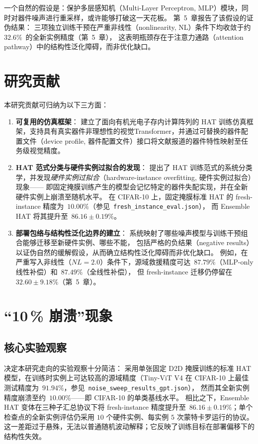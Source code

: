 一个自然的假设是：保护多层感知机（Multi-Layer Perceptron, MLP）模块，同时对器件噪声进行重采样，或许能够打破这一天花板。
第~5~章报告了该假设的证伪结果：
三项独立训练干预在严重非线性（nonlinearity, NL）条件下均收敛于约~$32.6\%$~的全新实例精度（第~5~章），
这表明瓶颈存在于注意力通路（attention pathway）中的结构性泛化障碍，而非优化缺口。

\section{研究贡献}

本研究贡献可归纳为以下三方面：

\begin{enumerate}
    \item \textbf{可复用的仿真框架}：
    建立了面向有机光电子存内计算阵列的 HAT 训练仿真框架，支持具有真实器件非理想性的视觉Transformer，并通过可替换的器件配置文件（device profile, 器件配置文件）接口将文献报道的器件特性映射至任务级视觉精度。

    \item \textbf{HAT 范式分类与硬件实例过拟合的发现}：
    提出了 HAT 训练范式的系统分类学，并发现\emph{硬件实例过拟合}（hardware-instance overfitting, 硬件实例过拟合）现象——
    即固定掩膜训练产生的模型会记忆特定的器件失配实现，并在全新硬件实例上崩溃至随机水平。
    在 CIFAR-10 上，固定掩膜标准 HAT 的 fresh-instance 精度为~$10.00\%$（参见~\texttt{fresh\_instance\_eval.json}），
    而 Ensemble HAT 将其提升至~$86.16\pm0.19\%$。

    \item \textbf{部署包络与结构性泛化边界的建立}：
    系统映射了哪些噪声模型与训练干预组合能够迁移至新硬件实例、哪些不能，
    包括严格的负结果（negative results）以证伪自然的缓解假设，从而确立结构性泛化障碍而非优化缺口。
    例如，在严重写入非线性（$NL=2.0$）条件下，源域救援精度可达~$87.79\%$（MLP-only 线性补偿）和~$87.49\%$（全线性补偿），
    但 fresh-instance 迁移仍停留在~$32.60\pm9.18\%$（第~5~章）。
\end{enumerate}

\section{``10\,\% 崩溃''现象}

\subsection{核心实验观察}

决定本研究走向的实验观察十分简洁：
采用单张固定 D2D 掩膜训练的标准 HAT 模型，在训练时实例上可达较高的源域精度（Tiny-ViT V4 在 CIFAR-10 上最佳测试精度为~$91.94\%$，参见~\texttt{noise\_sweep\_results\_gpt.json}），
然而其全新实例精度崩溃至约~$10.00\%$——即 CIFAR-10 的单类基线水平。
相比之下，Ensemble HAT 变体在三种子汇总协议下将 fresh-instance 精度提升至~$86.16\pm0.19\%$；单个检查点的全新实例评估仍采用 $10$ 个硬件实例、每实例 $5$ 次蒙特卡罗运行的协议。
这一差距过于悬殊，无法以普通随机波动解释；它反映了训练目标在部署偏移下的结构性失效。

